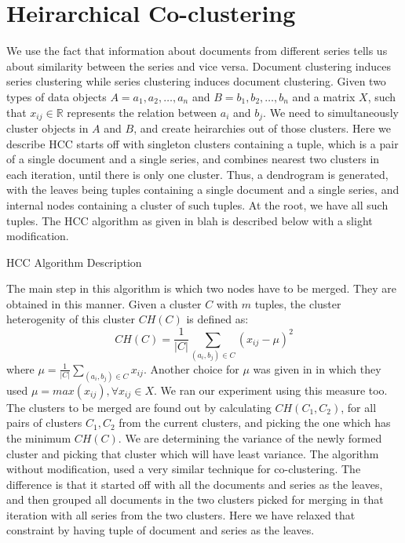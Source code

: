 \documentclass[11pt,twocolumn]{article}
\begin{document}
\section{Heirarchical Co-clustering}
We use the fact that information about documents from different series tells us about similarity between the series and vice versa. Document clustering induces series clustering while series clustering induces document clustering.
Given two types of data objects $A={a_1,a_2,\ldots,a_n}$ and $B={b_1,b_2,\ldots,b_n}$ and a matrix $X$, such that $x_{ij} \in \mathbb{R}$ represents the relation between $a_i$ and $b_j$. We need to simultaneously cluster objects in $A$ and $B$, and create heirarchies out of those clusters.
Here we describe 
HCC starts off with singleton clusters containing a tuple, which is a pair of a single document and a single series, and combines nearest two clusters in each iteration, until there is only one cluster. Thus, a dendrogram is generated, with the leaves being tuples containing a single document and a single series, and internal nodes containing a cluster of such tuples. At the root, we have all such tuples.
The HCC algorithm as given in blah is described below with a slight modification.
\begin{algorithm}[H]
  \caption{HCC Algorithm Description}
  \label{hcc_algo}
  \begin{algorithmic}
    \ENDFOR
  \end{algorithmic}
\end{algorithm}
The main step in this algorithm is which two nodes have to be merged. They are obtained in this manner.
Given a cluster $C$ with $m$ tuples, the cluster heterogenity of this cluster $CH(C)$ is defined as:
\begin{displaymath}
  CH(C)=\frac{1}{|C|}\sum_{(a_i,b_j) \in C}(x_{ij}-\mu)^2
\end{displaymath}
where $\mu=\frac{1}{|C|}\sum_{(a_i,b_j) \in C}x_{ij}$.
Another choice for $\mu$ was given in \cite{HCC2} in which they used $\mu=max(x_{ij}), \forall x_{ij} \in X$. We ran our experiment using this measure too.
The clusters to be merged are found out by calculating $CH(C_1,C_2)$, for all pairs of clusters $C_1,C_2$ from the current clusters, and picking the one which has the minimum $CH(C)$. We are determining the variance of the newly formed cluster and picking that cluster which will have least variance.
The algorithm without modification, used a very similar technique for co-clustering. The difference is that it started off with all the documents and series as the leaves, and then grouped all documents in the two clusters picked for merging in that iteration with all series from the two clusters. Here we have relaxed that constraint by having tuple of document and series as the leaves.
\end{document}
